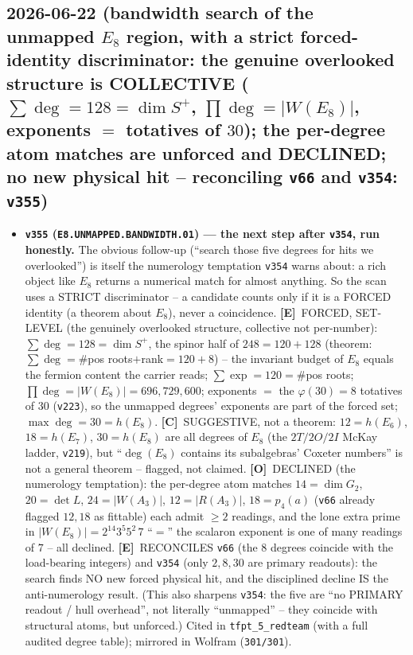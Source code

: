 \documentclass[11pt]{article}
\providecommand{\mE}{\textbf{[E]}}\providecommand{\mC}{\textbf{[C]}}
\providecommand{\mO}{\textbf{[O]}}\providecommand{\mX}{\textbf{[X]}}
\providecommand{\vref}[1]{\texttt{#1}}
\begin{document}
\subsection*{2026-06-22 (bandwidth search of the unmapped $E_8$ region, with a strict forced-identity discriminator: the genuine overlooked structure is COLLECTIVE ($\sum\deg=128=\dim S^+$, $\prod\deg=|W(E_8)|$, exponents $=$ totatives of $30$); the per-degree atom matches are unforced and DECLINED; no new physical hit -- reconciling \texttt{v66} and \texttt{v354}: \texttt{v355})}
\begin{itemize}
\item \textbf{\texttt{v355} (\texttt{E8.UNMAPPED.BANDWIDTH.01}) --- the next step after \vref{v354}, run honestly.} The
obvious follow-up (``search those five degrees for hits we overlooked'') is itself the numerology temptation
\vref{v354} warns about: a rich object like $E_8$ returns a numerical match for almost anything. So the scan uses a
STRICT discriminator -- a candidate counts only if it is a FORCED identity (a theorem about $E_8$), never a
coincidence. \mE\ FORCED, SET-LEVEL (the genuinely overlooked structure, collective not per-number): $\sum\deg=128=
\dim S^+$, the spinor half of $248=120+128$ (theorem: $\sum\deg=\#$pos roots$+$rank$=120+8$) -- the invariant budget
of $E_8$ equals the fermion content the carrier reads; $\sum\exp=120=\#$pos roots; $\prod\deg=|W(E_8)|=696{,}729{,}600$;
exponents $=$ the $\varphi(30){=}8$ totatives of $30$ (\vref{v223}), so the unmapped degrees' exponents are part of the
forced set; $\max\deg=30=h(E_8)$. \mC\ SUGGESTIVE, not a theorem: $12{=}h(E_6)$, $18{=}h(E_7)$, $30{=}h(E_8)$ are all
degrees of $E_8$ (the $2T/2O/2I$ McKay ladder, \vref{v219}), but ``$\deg(E_8)$ contains its subalgebras' Coxeter
numbers'' is not a general theorem -- flagged, not claimed. \mO\ DECLINED (the numerology temptation): the per-degree
atom matches $14{=}\dim G_2$, $20{=}\det L$, $24{=}|W(A_3)|$, $12{=}|R(A_3)|$, $18{=}p_4(a)$ (\vref{v66} already flagged
$12,18$ as fittable) each admit $\ge2$ readings, and the lone extra prime in $|W(E_8)|=2^{14}3^5 5^2\,7$ ``$=$'' the
scalaron exponent is one of many readings of $7$ -- all declined. \mE\ RECONCILES \vref{v66} (the 8 degrees coincide
with the load-bearing integers) and \vref{v354} (only $2,8,30$ are primary readouts): the search finds NO new forced
physical hit, and the disciplined decline IS the anti-numerology result. (This also sharpens \vref{v354}: the five are
``no PRIMARY readout / hull overhead'', not literally ``unmapped'' -- they coincide with structural atoms, but
unforced.) Cited in \texttt{tfpt\_5\_redteam} (with a full audited degree table); mirrored in Wolfram (\texttt{301/301}).
\end{itemize}
\end{document}
